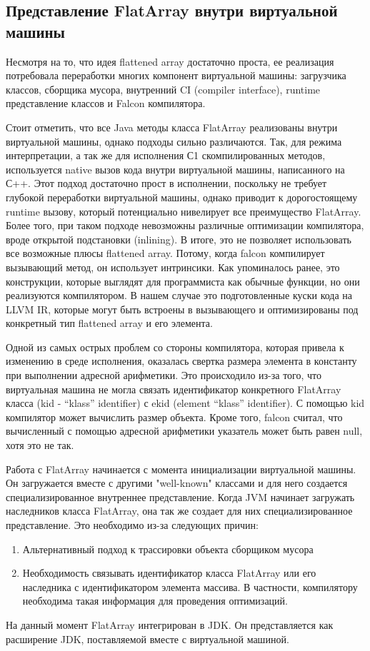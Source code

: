 \subsection{Представление FlatArray внутри виртуальной машины}
Несмотря на то, что идея flattened array достаточно проста, ее реализация потребовала переработки многих компонент виртуальной машины: загрузчика классов, сборщика мусора, внутренний CI (compiler interface), runtime представление классов и Falcon компилятора.
\par 
Стоит отметить, что все Java методы класса FlatArray реализованы внутри виртуальной машины, однако подходы сильно различаются. Так, для режима интерпретации, а так же для исполнения С1 скомпилированных методов, используется native вызов кода внутри виртуальной машины, написанного на С++. Этот подход достаточно прост в исполнении, поскольку не требует глубокой переработки виртуальной машины, однако приводит к дорогостоящему runtime вызову, который потенциально нивелирует все преимущество FlatArray. Более того, при таком подходе невозможны различные оптимизации компилятора, вроде открытой подстановки (inlining).
В итоге, это не позволяет использовать все возможные плюсы flattened array. Потому, когда falcon компилирует вызывающий метод, он использует интринсики. Как упоминалось ранее, это конструкции, которые выглядят для программиста как обычные функции, но они реализуются компилятором. В нашем случае это подготовленные куски кода на LLVM IR, которые могут быть встроены в вызывающего и оптимизированы под конкретный тип flattened array и его элемента.  
\par
Одной из самых острых проблем со стороны компилятора, которая привела к изменению в среде исполнения, оказалась свертка размера элемента в константу при выполнении адресной арифметики. Это происходило из-за того, что виртуальная машина не могла связать идентификатор конкретного FlatArray класса (kid - “klass” identifier) с ekid (element “klass” identifier). С помощью kid компилятор может вычислить размер объекта. Кроме того, falcon считал, что вычисленный с помощью адресной арифметики указатель может быть равен null, хотя это не так. 
\par 
Работа с FlatArray начинается с момента инициализации виртуальной машины. Он загружается вместе с другими "well-known" классами и для него создается специализированное внутреннее представление. 
Когда JVM начинает загружать наследников класса FlatArray, она так же создает для них специализированное представление.
Это необходимо из-за следующих причин:
\begin{enumerate}
	\item Альтернативный подход к трассировки объекта сборщиком мусора
	\item Необходимость связывать идентификатор класса FlatArray или его наследника с идентификатором элемента массива. В частности, компилятору необходима такая информация для проведения оптимизаций.
\end{enumerate}
\par
На данный момент FlatArray интегрирован в JDK. Он представляется как расширение JDK, поставляемой вместе с виртуальной машиной.
